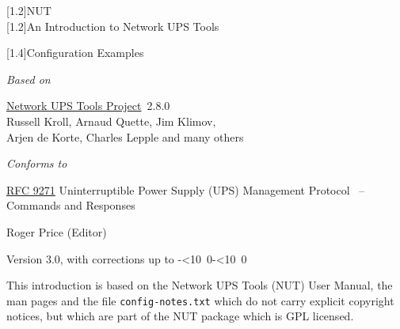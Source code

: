\documentclass[12pt]{article}
\def\isodate{\leavevmode\hbox{\the\year-\twodigits\month-\twodigits\day}}
\def\twodigits#1{\ifnum#1<10 0\fi\the#1}
\newcommand{\Version}{3.0}
\renewcommand{\thepage}{}            %
\newcommand{\RFCnumber}{9271}
\newcommand{\RFC}{\href{https://www.rfc-editor.org/info/rfc\RFCnumber}%
                       {RFC \RFCnumber} Uninterruptible Power Supply (UPS) Management Protocol\ %
                                        -- Commands and Responses}
\newcommand{\NUTproj}{\href{https://networkupstools.org}{Network UPS Tools Project}}
\begin{document}
\begin{center}
\scalebox{1.0}[1.2]{\textsf{\Huge{NUT}}} \\[6mm]
\scalebox{1.0}[1.2]{\textsf{\Large{An Introduction to Network UPS Tools}}} \\

\vspace*{\fill}

\scalebox{1.2}[1.4]{\textsf{\Huge{Configuration Examples}}} \\

\vspace*{\fill}

\textsl{Based on}
\vspace{2mm}

\textsf{\large{\NUTproj\ 2.8.0}} \\
\textsf{\normalsize Russell Kroll},
\textsf{\normalsize Arnaud Quette},
\textsf{\normalsize Jim Klimov}, \\
\textsf{\normalsize Arjen de Korte},
\textsf{\normalsize Charles Lepple and many others}

\vspace{4mm}
\textsl{Conforms to}
\vspace{2mm}

\begin{minipage}[t]{0.6\textwidth}
\begin{center}\textsf{\large{\RFC}}\end{center}
\end{minipage}

\vspace*{\fill}

\textsf{\normalsize Roger Price} \hspace{3mm} \textsf{(Editor)}

\vspace*{\fill}

\textsf{Version \Version, with corrections up to \isodate} \\
\end{center}

\vspace*{\fill}

\renewcommand{\thepage}{\roman{page}}

This introduction is based on the Network UPS Tools (NUT) User Manual, the man
pages and the file \texttt{config-notes.txt} which do not carry explicit
copyright notices, but which are part of the NUT package which is GPL
licensed.
\end{document}
